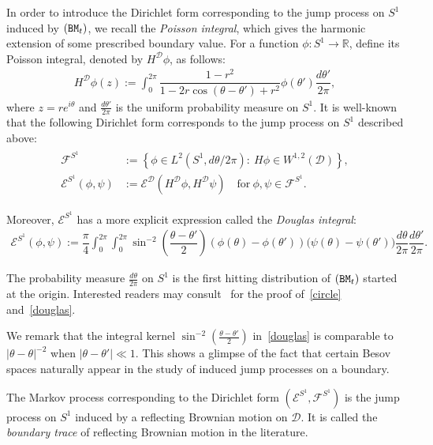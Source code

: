 \documentclass[AHL,Unicode,longabstracts,published]{cedram}
\newcommand{\ce}{\mathcal{E}}
\newcommand{\cf}{\mathcal{F}}
\newcommand{\cd}{\mathcal{D}}
\newcommand{\br}{\mathbb{R}}
\begin{document}
In order to introduce the Dirichlet form corresponding to the jump process on $S^1$ induced by $({\tt BM}_t)$, we recall the \emph{Poisson integral}, which gives the harmonic extension of some prescribed boundary value. For a function $\phi:S^1\to\br$, define its Poisson integral, denoted by $H^\cd\phi$, as follows:
\begin{align}\label{poisson int}
H^\cd\phi(z):=\int_0^{2\pi}\dfrac{1-r^2}{1-2r\cos(\theta-\theta')+r^2}\phi(\theta')\dfrac{d\theta'}{2\pi},
\end{align}
where $z=re^{i\theta}$ and $\frac{d\theta'}{2\pi}$ is the uniform probability measure on $S^1$. It is well-known that the following Dirichlet form corresponds to the jump process on $S^1$ described above:
\begin{align}\label{circle}
\begin{split}
\cf^{S^1}&:=\left\{\phi\in L^2\left(S^1, d\theta/2\pi\right):\ H\phi\in W^{1,2}(\cd)\right\},\\
\ce^{S^1}(\phi,\psi)&:=\ce^\cd\left(H^\cd\phi,H^\cd\psi\right)\quad \text{for}\ \phi,\psi\in\cf^{S^1}.
\end{split}
\end{align}

Moreover, $\ce^{S^1}$ has a more explicit expression called the \emph{Douglas integral}:
\begin{align}\label{douglas}
\ce^{S^1}(\phi,\psi):=\dfrac{\pi}{4}\int_0^{2\pi}\int_0^{2\pi}\sin^{-2}\left(\dfrac{\theta-\theta'}{2}\right)(\phi(\theta)-\phi(\theta'))\big(\psi(\theta)-\psi(\theta')\big)\dfrac{d\theta}{2\pi}\dfrac{d\theta'}{2\pi}.
\end{align}

The probability measure $\frac{d\theta}{2\pi}$ on $S^1$ is the first hitting distribution of $({\tt BM}_t)$ started at the origin. Interested readers may consult~\cite[page 13-14]{FOT} for the proof of~\eqref{circle} and~\eqref{douglas}.

We remark that the integral kernel $\sin^{-2}(\frac{\theta-\theta'}{2})$ in~\eqref{douglas} is comparable to $|\theta-\theta|^{-2}$ when $|\theta-\theta'|\ll1$. This shows a glimpse of the fact that certain Besov spaces naturally appear in the study of induced jump processes on a boundary.

The Markov process corresponding to the Dirichlet form $(\ce^{S^1}, \cf^{S^1})$ is the jump process on $S^1$ induced by a reflecting Brownian motion on $\cd$. It is called the \emph{boundary trace} of reflecting Brownian motion in the literature.
\end{document}
